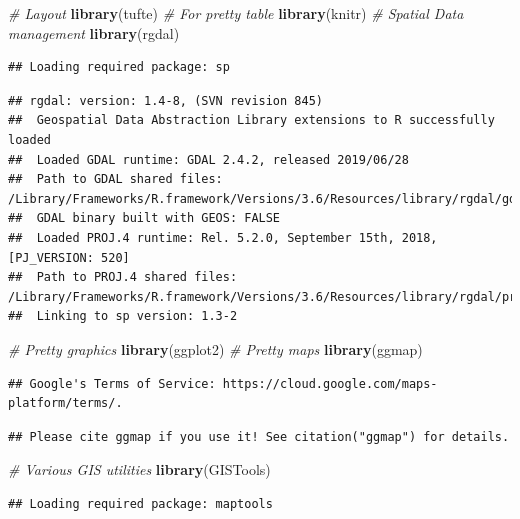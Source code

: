 \documentclass[]{book}
\newenvironment{Shaded}{\begin{snugshade}}{\end{snugshade}}
\newcommand{\KeywordTok}[1]{\textcolor[rgb]{0.13,0.29,0.53}{\textbf{#1}}}
\newcommand{\CommentTok}[1]{\textcolor[rgb]{0.56,0.35,0.01}{\textit{#1}}}
\newcommand{\NormalTok}[1]{#1}
\begin{document}
\begin{Shaded}
\begin{Highlighting}[]
\CommentTok{# Layout}
\KeywordTok{library}\NormalTok{(tufte)}
\CommentTok{# For pretty table}
\KeywordTok{library}\NormalTok{(knitr)}
\CommentTok{# Spatial Data management}
\KeywordTok{library}\NormalTok{(rgdal)}
\end{Highlighting}
\end{Shaded}

\begin{verbatim}
## Loading required package: sp
\end{verbatim}

\begin{verbatim}
## rgdal: version: 1.4-8, (SVN revision 845)
##  Geospatial Data Abstraction Library extensions to R successfully loaded
##  Loaded GDAL runtime: GDAL 2.4.2, released 2019/06/28
##  Path to GDAL shared files: /Library/Frameworks/R.framework/Versions/3.6/Resources/library/rgdal/gdal
##  GDAL binary built with GEOS: FALSE 
##  Loaded PROJ.4 runtime: Rel. 5.2.0, September 15th, 2018, [PJ_VERSION: 520]
##  Path to PROJ.4 shared files: /Library/Frameworks/R.framework/Versions/3.6/Resources/library/rgdal/proj
##  Linking to sp version: 1.3-2
\end{verbatim}

\begin{Shaded}
\begin{Highlighting}[]
\CommentTok{# Pretty graphics}
\KeywordTok{library}\NormalTok{(ggplot2)}
\CommentTok{# Pretty maps}
\KeywordTok{library}\NormalTok{(ggmap)}
\end{Highlighting}
\end{Shaded}

\begin{verbatim}
## Google's Terms of Service: https://cloud.google.com/maps-platform/terms/.
\end{verbatim}

\begin{verbatim}
## Please cite ggmap if you use it! See citation("ggmap") for details.
\end{verbatim}

\begin{Shaded}
\begin{Highlighting}[]
\CommentTok{# Various GIS utilities}
\KeywordTok{library}\NormalTok{(GISTools)}
\end{Highlighting}
\end{Shaded}

\begin{verbatim}
## Loading required package: maptools
\end{verbatim}
\end{document}
